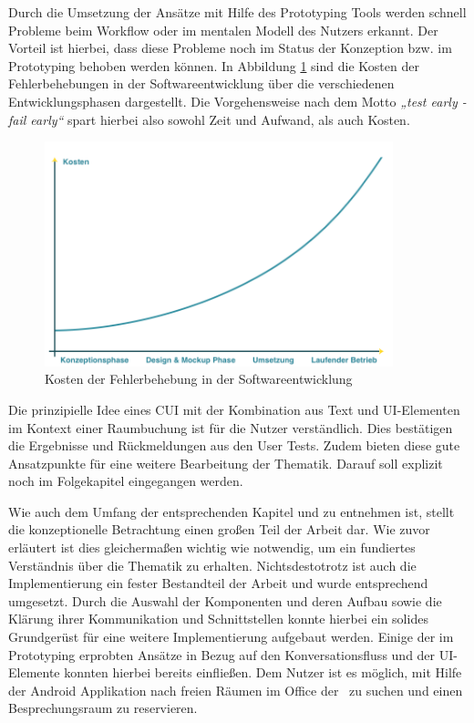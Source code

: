Durch die Umsetzung der Ansätze mit Hilfe des Prototyping Tools werden schnell Probleme beim Workflow oder im mentalen Modell des Nutzers erkannt. Der Vorteil ist hierbei, dass diese Probleme noch im Status der Konzeption bzw. im Prototyping behoben werden können. In Abbildung \ref{fig:kosten-fehlerbehebung-softwareentwicklung} sind die Kosten der Fehlerbehebungen in der Softwareentwicklung über die verschiedenen Entwicklungsphasen dargestellt. Die Vorgehensweise nach dem Motto \textit{„test early - fail early“} spart hierbei also sowohl Zeit und Aufwand, als auch Kosten.
\newline
\begin{figure}[H]
    \centering
    \includegraphics[width=0.9\textwidth]{bilder/fehlerkostensoftware.png}
    \caption{Kosten der Fehlerbehebung in der Softwareentwicklung \cite{claus_degendorfer_wie_2016}}
    \label{fig:kosten-fehlerbehebung-softwareentwicklung}
\end{figure}

Die prinzipielle Idee eines \acl{CUI} mit der Kombination aus Text und \ac{UI}-Elementen im Kontext einer Raumbuchung ist für die Nutzer verständlich. Dies bestätigen die Ergebnisse und Rückmeldungen aus den User Tests. Zudem bieten diese gute Ansatzpunkte für eine weitere Bearbeitung der Thematik. Darauf soll explizit noch im Folgekapitel \textit{} eingegangen werden.

Wie auch dem Umfang der entsprechenden Kapitel \textit{} und \textit{} zu entnehmen ist, stellt die konzeptionelle Betrachtung einen großen Teil der Arbeit dar. Wie zuvor erläutert ist dies gleichermaßen wichtig wie notwendig, um ein fundiertes Verständnis über die Thematik zu erhalten. Nichtsdestotrotz ist auch die Implementierung ein fester Bestandteil der Arbeit und wurde entsprechend umgesetzt. Durch die Auswahl der Komponenten und deren Aufbau sowie die Klärung ihrer Kommunikation und Schnittstellen konnte hierbei ein solides Grundgerüst für eine weitere Implementierung aufgebaut werden. Einige der im Prototyping erprobten Ansätze in Bezug auf den Konversationsfluss und der \ac{UI}-Elemente konnten hierbei bereits einfließen. Dem Nutzer ist es möglich, mit Hilfe der Android Applikation nach freien Räumen im Office der \adorsys\ zu suchen und einen Besprechungsraum zu reservieren.

